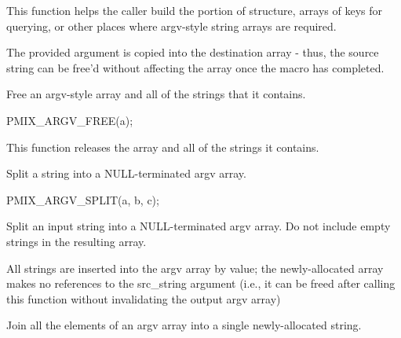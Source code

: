 This function helps the caller build the  portion of  structure, arrays of keys for querying, or other places where argv-style string arrays are required.

\adviceuserstart
The provided argument is copied into the destination array - thus, the source string can be free'd without affecting the array once the macro has completed.
\adviceuserend


Free an argv-style array and all of the strings that it contains.

\cspecificstart
\begin{codepar}
PMIX_ARGV_FREE(a);
\end{codepar}
\cspecificend

\begin{arglist}
\end{arglist}

This function releases the array and all of the strings it contains.


Split a string into a NULL-terminated argv array.

\cspecificstart
\begin{codepar}
PMIX_ARGV_SPLIT(a, b, c);
\end{codepar}
\cspecificend

\begin{arglist}
\end{arglist}

Split an input string into a NULL-terminated argv array. Do not include empty strings in the resulting array.

\adviceuserstart
All strings are inserted into the argv array by value; the newly-allocated array makes no references to the src_string argument (i.e., it can be freed after calling this function without invalidating the output argv array)
\adviceuserend


Join all the elements of an argv array into a single newly-allocated string.

